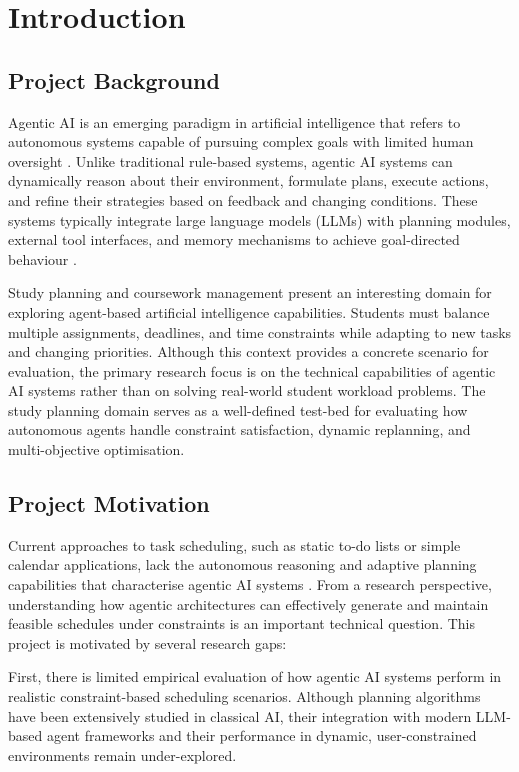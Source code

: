 \documentclass[12pt]{article}
\begin{document}
\newpage
\tableofcontents

\newpage

\section{Introduction}

\subsection{Project Background}
Agentic AI is an emerging paradigm in artificial intelligence that refers to autonomous systems capable of pursuing complex goals with limited human oversight \parencite{10849561}. Unlike traditional rule-based systems, agentic AI systems can dynamically reason about their environment, formulate plans, execute actions, and refine their strategies based on feedback and changing conditions. These systems typically integrate large language models (LLMs) with planning modules, external tool interfaces, and memory mechanisms to achieve goal-directed behaviour \parencite{hughes2025ai}.

Study planning and coursework management present an interesting domain for exploring agent-based artificial intelligence capabilities. Students must balance multiple assignments, deadlines, and time constraints while adapting to new tasks and changing priorities. Although this context provides a concrete scenario for evaluation, the primary research focus is on the technical capabilities of agentic AI systems rather than on solving real-world student workload problems. The study planning domain serves as a well-defined test-bed for evaluating how autonomous agents handle constraint satisfaction, dynamic replanning, and multi-objective optimisation.
\subsection{Project Motivation}
Current approaches to task scheduling, such as static to-do lists or simple calendar applications, lack the autonomous reasoning and adaptive planning capabilities that characterise agentic AI systems \parencite{chen2023survey}. From a research perspective, understanding how agentic architectures can effectively generate and maintain feasible schedules under constraints is an important technical question. This project is motivated by several research gaps:

First, there is limited empirical evaluation of how agentic AI systems perform in realistic constraint-based scheduling scenarios. Although planning algorithms have been extensively studied in classical AI, their integration with modern LLM-based agent frameworks and their performance in dynamic, user-constrained environments remain under-explored.
\end{document}
